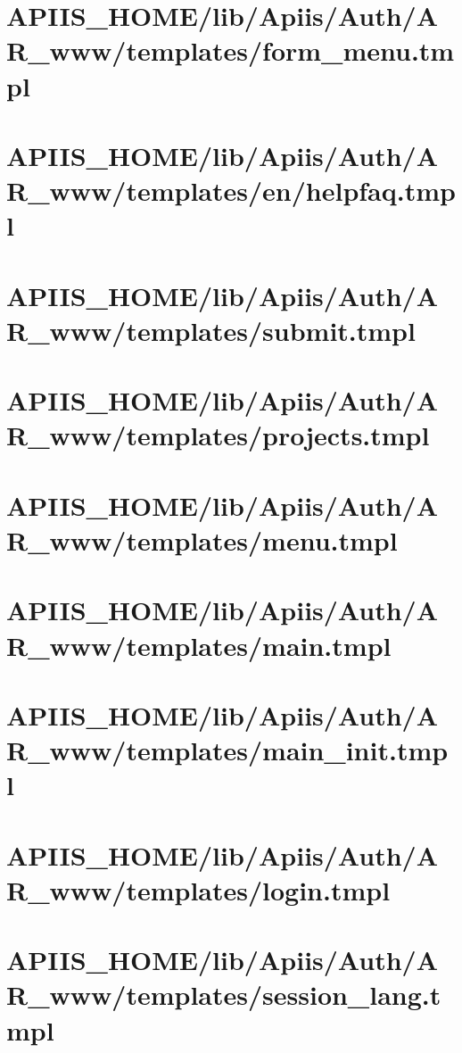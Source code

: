 \section{APIIS\_HOME/lib/Apiis/Auth/AR_www/templates/form\_menu.tmpl} 
\section{APIIS\_HOME/lib/Apiis/Auth/AR_www/templates/en/helpfaq.tmpl} 
\section{APIIS\_HOME/lib/Apiis/Auth/AR_www/templates/submit.tmpl} 
\section{APIIS\_HOME/lib/Apiis/Auth/AR_www/templates/projects.tmpl} 
\section{APIIS\_HOME/lib/Apiis/Auth/AR_www/templates/menu.tmpl} 
\section{APIIS\_HOME/lib/Apiis/Auth/AR_www/templates/main.tmpl} 
\section{APIIS\_HOME/lib/Apiis/Auth/AR_www/templates/main\_init.tmpl} 
\section{APIIS\_HOME/lib/Apiis/Auth/AR_www/templates/login.tmpl} 
\section{APIIS\_HOME/lib/Apiis/Auth/AR_www/templates/session\_lang.tmpl} 
